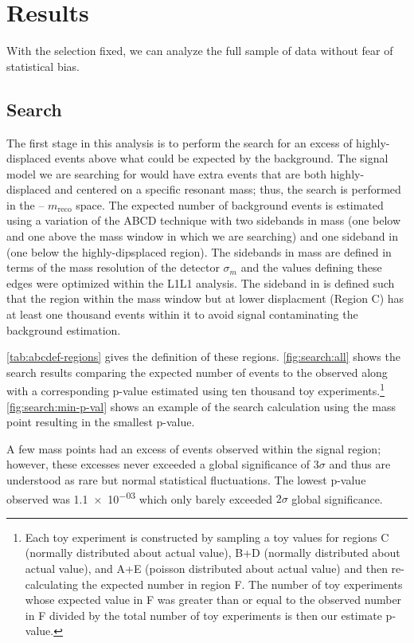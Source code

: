 \section{Results}
With the selection fixed, we can analyze the full sample of data without fear of
statistical bias.

\subsection{Search}
The first stage in this analysis is to perform the search for an excess of highly-displaced
events above what could be expected by the background.
The signal model we are searching for would have extra events that are both highly-displaced
and centered on a specific resonant mass; thus, the search is performed in the \minyzero -- $m_\mathrm{reco}$
space.
The expected number of background events is estimated using a variation of the ABCD technique
with two sidebands in mass (one below and one above the mass window in which we are searching)
and one sideband in \minyzero (one below the highly-dipsplaced region).
The sidebands in mass are defined in terms of the mass resolution of the detector $\sigma_m$
and the values defining these edges were optimized within the L1L1 analysis.
The sideband in \minyzero is defined such that the region within the mass window but
at lower displacment (Region C) has at least one thousand events within it to avoid signal contaminating
the background estimation.

\cref{tab:abcdef-regions} gives the definition of these regions.
\cref{fig:search:all} shows the search results comparing the expected number of events to the
observed along with a corresponding p-value estimated using ten thousand toy experiments.\footnote{
  Each toy experiment is constructed by sampling a toy values for regions C (normally distributed about actual value),
  B+D (normally distributed about actual value), and A+E (poisson distributed about actual value) and
  then re-calculating the expected number in region F. The number of toy experiments whose expected
  value in F was greater than or equal to the observed number in F divided by the total number of
  toy experiments is then our estimate p-value.
}
\cref{fig:search:min-p-val} shows an example of the search calculation using the mass point resulting
in the smallest p-value.

A few mass points had an excess of events observed within the signal region; however,
these excesses never exceeded a global significance of $3\sigma$ and thus are understood
as rare but normal statistical fluctuations.
The lowest p-value observed was \num{1.1e-03} which only barely exceeded $2\sigma$ global significance.


